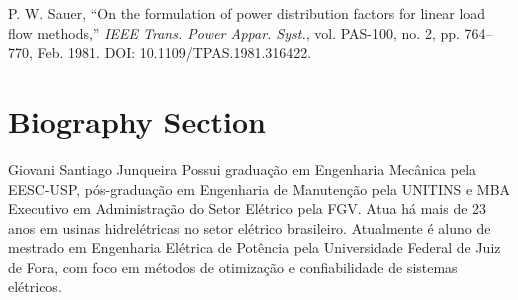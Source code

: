 \documentclass[journal]{IEEEtran}
\begin{document}
 

\begin{thebibliography}{1}


P. W. Sauer, ``On the formulation of power distribution factors for linear load flow methods,'' \textit{IEEE Trans. Power Appar. Syst.}, vol. PAS-100, no. 2, pp. 764--770, Feb. 1981. DOI: 10.1109/TPAS.1981.316422.


\end{thebibliography}


\newpage

\section{Biography Section}

\begin{IEEEbiography}{Giovani Santiago Junqueira}
Possui graduação em Engenharia Mecânica pela EESC-USP, pós-graduação em Engenharia de Manutenção pela UNITINS e MBA Executivo em Administração do Setor Elétrico pela FGV. Atua há mais de 23 anos em usinas hidrelétricas no setor elétrico brasileiro. Atualmente é aluno de mestrado em Engenharia Elétrica de Potência pela Universidade Federal de Juiz de Fora, com foco em métodos de otimização e confiabilidade de sistemas elétricos.
\end{IEEEbiography}
\end{document}
